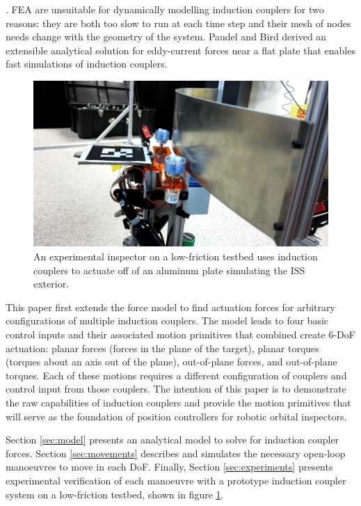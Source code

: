 \documentclass[letterpaper, 10 pt, conference]{ieeeconf}  %
\begin{document}
\cite{Bird2008}. FEA are unsuitable for dynamically modelling induction couplers for two reasons: they are both too slow to run at each time step and their mesh of nodes needs change with the geometry of the system. Paudel and Bird derived an extensible analytical solution for eddy-current forces near a flat plate that enables fast simulations of induction couplers\cite{Paudel2013}. 
%
%
 \begin{figure}[thpb]
      \centering

      \includegraphics[width = 1.0\linewidth]{figures/screenshot.png}
      \caption{An experimental inspector on a low-friction testbed uses induction couplers to actuate off of an aluminum plate simulating the ISS exterior.}
      \label{fig:realpicture}
   \end{figure}
\par This paper first extends the force model to find actuation forces for arbitrary configurations of multiple induction couplers. The model leads to four basic control inputs and their associated motion primitives that combined create 6-DoF actuation: planar forces (forces in the plane of the target), planar torques (torques about an axis out of the plane), out-of-plane forces, and out-of-plane torques. Each of these motions requires a different configuration of couplers and control input from those couplers. The intention of this paper is to demonstrate the raw capabilities of induction couplers and provide the motion primitives that will serve as the foundation of position controllers for robotic orbital inspectors. 

\par Section \ref{sec:model} presents an analytical model to solve for induction coupler forces. Section \ref{sec:movements} describes and simulates the necessary open-loop manoeuvres to move in each DoF. Finally, Section \ref{sec:experiments} presents experimental verification of each manoeuvre with a prototype induction coupler system on a low-friction testbed, shown in figure \ref{fig:realpicture}.
\end{document}
